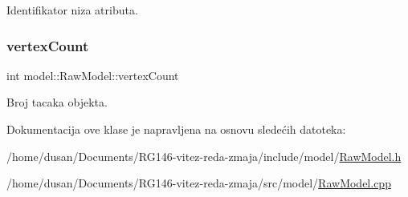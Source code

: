 Identifikator niza atributa. 

\mbox{\label{classmodel_1_1RawModel_a76a976df29d34a1d0f7a7e8f42a4477c}} 
\subsubsection{\texorpdfstring{vertex\+Count}{vertexCount}}
{\footnotesize\ttfamily int model\+::\+Raw\+Model\+::vertex\+Count\hspace{0.3cm}{\ttfamily [private]}}



Broj tacaka objekta. 



Dokumentacija ove klase je napravljena na osnovu sledećih datoteka\+:\begin{DoxyCompactItemize}
\item 
/home/dusan/\+Documents/\+R\+G146-\/vitez-\/reda-\/zmaja/include/model/\hyperlink{RawModel_8h}{Raw\+Model.\+h}\item 
/home/dusan/\+Documents/\+R\+G146-\/vitez-\/reda-\/zmaja/src/model/\hyperlink{RawModel_8cpp}{Raw\+Model.\+cpp}\end{DoxyCompactItemize}
